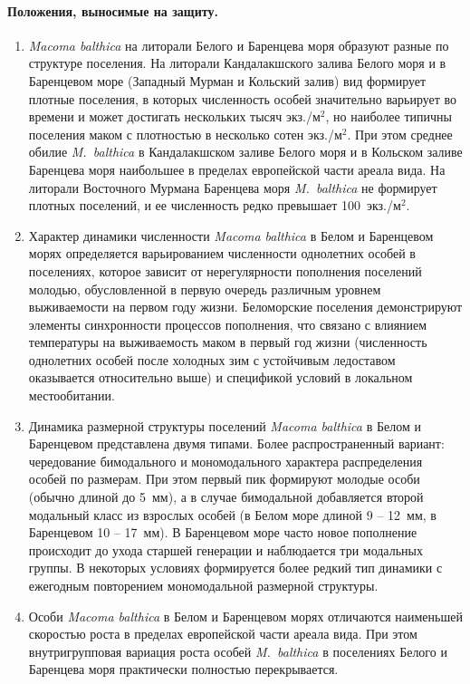 \paragraph{Положения, выносимые на защиту.}
\begin{enumerate}
\item \textit{Macoma balthica} на литорали Белого и Баренцева моря образуют разные по структуре поселения.
На литорали Кандалакшского залива Белого моря и в Баренцевом море (Западный Мурман и Кольский залив) вид  формирует плотные поселения, в которых численность особей значительно варьирует во времени и может достигать нескольких тысяч экз./м$^2$, но наиболее типичны поселения маком с плотностью в несколько сотен экз./м$^2$. 
При этом среднее обилие \textit{M.~balthica} в Кандалакшском заливе Белого моря и в Кольском заливе Баренцева моря наибольшее в пределах европейской части ареала вида.
На литорали Восточного Мурмана Баренцева моря \textit{M.~balthica} не формирует плотных поселений, и ее численность редко превышает 100~экз./м$^2$.

\item Характер динамики численности \textit{Macoma balthica} в Белом и Баренцевом морях определяется варьированием численности однолетних особей в поселениях, которое зависит от нерегулярности пополнения поселений молодью, обусловленной в первую очередь различным уровнем выживаемости на первом году жизни.
Беломорские поселения демонстрируют элементы синхронности процессов пополнения, что связано с влиянием температуры на выживаемость маком в первый год жизни  (численность однолетних особей после холодных зим с устойчивым ледоставом оказывается относительно выше) и спецификой условий в локальном местообитании.

\item Динамика размерной структуры поселений {\it Macoma balthica} в Белом и Баренцевом представлена двумя типами. 
Более распространенный вариант: чередование бимодального и мономодального характера распределения особей по размерам. 
При этом первый пик формируют молодые особи (обычно длиной до 5~мм), а в случае бимодальной добавляется второй модальный класс из взрослых особей (в Белом море длиной 9 -- 12~мм, в Баренцевом 10 -- 17~мм). 
В Баренцевом море часто новое пополнение происходит до ухода старшей генерации и наблюдается три модальных группы.
В некоторых условиях формируется более редкий тип динамики с ежегодным повторением мономодальной размерной структуры. 

\item Особи {\it Macoma balthica} в Белом и Баренцевом морях отличаются наименьшей скоростью роста в пределах европейской части ареала вида. 
При этом внутригрупповая вариация роста особей \textit{M.~balthica} в поселениях Белого и Баренцева моря практически полностью перекрывается.

\end{enumerate}


